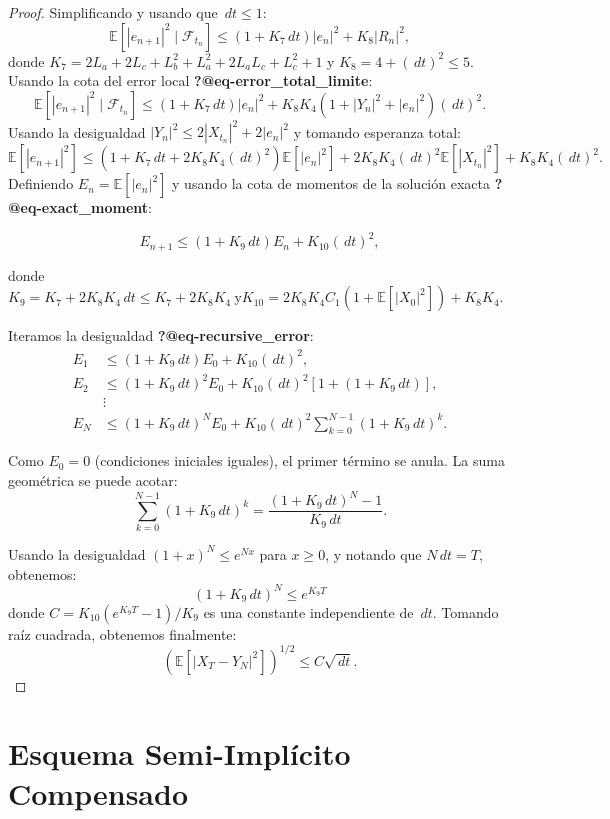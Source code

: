 \documentclass[
  spanish,
  us-letterpaper,
]{scrreprt}
\theoremstyle{plain}
\theoremstyle{plain}
\theoremstyle{definition}
\theoremstyle{remark}
\begin{document}
\begin{proof}
Simplificando y usando que \(\, dt \leq 1\):
\[\mathbb{E}[|e_{n+1}|^2 \mid \mathcal{F}_{t_n}] \leq (1 + K_7 \, dt) |e_n|^2 + K_8 |R_n|^2,\]
donde \(K_7 = 2L_a + 2L_c + L_b^2 + L_a^2 + 2L_a L_c + L_c^2 + 1\) y
\(K_8 = 4 + (\, dt)^2 \leq 5\). Usando la cota del error local
\textbf{?@eq-error\_total\_limite}:
\[\mathbb{E}[|e_{n+1}|^2 \mid \mathcal{F}_{t_n}] \leq (1 + K_7 \, dt) |e_n|^2 + K_8 K_4 (1 + |Y_n|^2 + |e_n|^2) (\, dt)^2.\]
Usando la desigualdad \(|Y_n|^2 \leq 2|X_{t_n}|^2 + 2|e_n|^2\) y tomando
esperanza total:
\[\mathbb{E}[|e_{n+1}|^2] \leq (1 + K_7 \, dt + 2K_8 K_4 (\, dt)^2) \mathbb{E}[|e_n|^2] + 2K_8 K_4 (\, dt)^2 \mathbb{E}[|X_{t_n}|^2] + K_8 K_4 (\, dt)^2.\]
Definiendo \(E_n = \mathbb{E}[|e_n|^2]\) y usando la cota de momentos de
la solución exacta \textbf{?@eq-exact\_moment}:

\[E_{n+1} \leq (1 + K_9 \, dt) E_n + K_{10} (\, dt)^2,\]

donde
\(K_9 = K_7 + 2K_8 K_4 \, dt \leq K_7 + 2K_8 K_4 \ \text{y} K_{10} = 2K_8 K_4 C_1 (1 + \mathbb{E}[|X_0|^2]) + K_8 K_4\).

Iteramos la desigualdad \textbf{?@eq-recursive\_error}:
\[\begin{aligned}
E_1 &\leq (1 + K_9 \, dt) E_0 + K_{10} (\, dt)^2, \\
E_2 &\leq (1 + K_9 \, dt)^2 E_0 + K_{10} (\, dt)^2 \left[1 + (1 + K_9 \, dt)\right], \\
&\vdots \\
E_N &\leq (1 + K_9 \, dt)^N E_0 + K_{10} (\, dt)^2 \sum_{k=0}^{N-1} (1 + K_9 \, dt)^k.
\end{aligned}\]

Como \(E_0 = 0\) (condiciones iniciales iguales), el primer término se
anula. La suma geométrica se puede acotar:
\[\sum_{k=0}^{N-1} (1 + K_9 \, dt)^k = \frac{(1 + K_9 \, dt)^N - 1}{K_9 \, dt}.\]

Usando la desigualdad \((1 + x)^N \leq e^{Nx}\) para \(x \geq 0\), y
notando que \(N\, dt = T\), obtenemos:
\[(1 + K_9 \, dt)^N \leq e^{K_9 T}\] donde
\(C = K_{10} (e^{K_9 T} - 1)/K_9\) es una constante independiente de
\(\,dt\). Tomando raíz cuadrada, obtenemos finalmente:
\[\left( \mathbb{E}[|X_T - Y_N|^2] \right)^{1/2} \leq C \sqrt{\,dt}. \]
\end{proof}

\section{Esquema Semi-Implícito
Compensado}\label{esquema-semi-impluxedcito-compensado}
\end{document}
